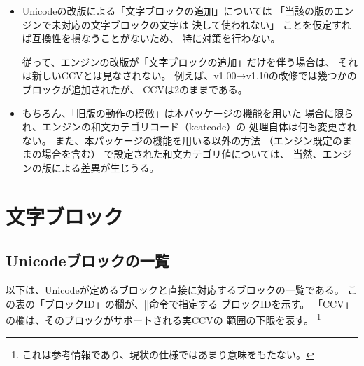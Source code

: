 \documentclass[uplatex,dvipdfmx,a4paper]{jsarticle}
\begin{document}
\begin{itemize}
\item Unicodeの改版による「文字ブロックの追加」については
  「当該の版のエンジンで未対応の文字ブロックの文字は
  決して使われない」
  ことを仮定すれば互換性を損なうことがないため、
  特に対策を行わない。

  従って、エンジンの改版が「文字ブロックの追加」だけを伴う場合は、
  それは新しいCCVとは見なされない。
  例えば、v1.00→v1.10の改修では幾つかのブロックが追加されたが、
  CCVは2のままである。

\item もちろん、「旧版の動作の模倣」は本パッケージの機能を用いた
  場合に限られ、{\upTeX}エンジンの和文カテゴリコード（kcatcode）の
  処理自体は何も変更されない。
  また、本パッケージの機能を用いる以外の方法
  （エンジン既定のままの場合を含む）
  で設定された和文カテゴリ値については、
  当然、エンジンの版による差異が生じうる。

\end{itemize}


\section{文字ブロック}
\label{sec:Blocks}

\subsection{Unicodeブロックの一覧}

以下は、Unicodeが定めるブロックと直接に対応するブロックの一覧である。
この表の「ブロックID」の欄が、|\cjkcategory|命令で指定する
ブロックIDを示す。
「CCV」の欄は、そのブロックがサポートされる実CCVの
範囲の下限を表す。
\footnote{これは参考情報であり、現状の仕様ではあまり意味をもたない。}
\end{document}
